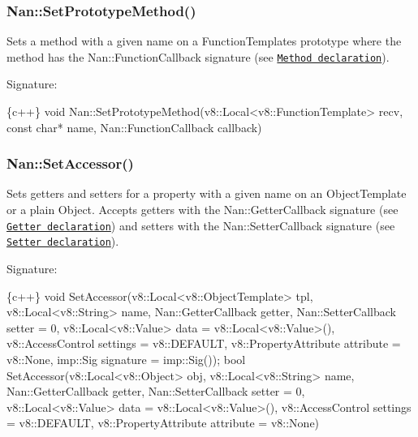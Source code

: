 \label{_api_nan_set_prototype_method}%
 \subsubsection*{Nan\+::\+Set\+Prototype\+Method()}

Sets a method with a given name on a {\ttfamily Function\+Template}\textquotesingle{}s prototype where the method has the {\ttfamily Nan\+::\+Function\+Callback} signature (see \href{#api_nan_method}{\tt Method declaration}).

Signature\+:


\begin{DoxyCode}
\{c++\}
void Nan::SetPrototypeMethod(v8::Local<v8::FunctionTemplate> recv,
                             const char* name,
                             Nan::FunctionCallback callback)
\end{DoxyCode}


\label{_api_nan_set_accessor}%
 \subsubsection*{Nan\+::\+Set\+Accessor()}

Sets getters and setters for a property with a given name on an {\ttfamily Object\+Template} or a plain {\ttfamily Object}. Accepts getters with the {\ttfamily Nan\+::\+Getter\+Callback} signature (see \href{#api_nan_getter}{\tt Getter declaration}) and setters with the {\ttfamily Nan\+::\+Setter\+Callback} signature (see \href{#api_nan_setter}{\tt Setter declaration}).

Signature\+:


\begin{DoxyCode}
\{c++\}
void SetAccessor(v8::Local<v8::ObjectTemplate> tpl,
                 v8::Local<v8::String> name,
                 Nan::GetterCallback getter,
                 Nan::SetterCallback setter = 0,
                 v8::Local<v8::Value> data = v8::Local<v8::Value>(),
                 v8::AccessControl settings = v8::DEFAULT,
                 v8::PropertyAttribute attribute = v8::None,
                 imp::Sig signature = imp::Sig());
bool SetAccessor(v8::Local<v8::Object> obj,
                 v8::Local<v8::String> name,
                 Nan::GetterCallback getter,
                 Nan::SetterCallback setter = 0,
                 v8::Local<v8::Value> data = v8::Local<v8::Value>(),
                 v8::AccessControl settings = v8::DEFAULT,
                 v8::PropertyAttribute attribute = v8::None)
\end{DoxyCode}


